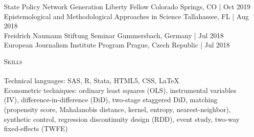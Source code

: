 \documentclass[a4paper,11pt]{article}
\newcommand{\lineunder} {
    \vspace*{-8pt} \\
    \hspace*{-18pt} \hrulefill \\
}
\newcommand{\header} [1] {
    {\hspace*{-18pt}\vspace*{6pt} \textsc{\large{#1}}}
    \vspace*{-6pt} \lineunder
}
\begin{document}
State Policy Network Generation Liberty Fellow \hfill Colorado Springs, CO | Oct 2019 \\

Epistemological and Methodological Approaches in Science \hfill Tallahassee, FL | Aug 2018\\

Freidrich Naumann Stiftung Seminar \hfill Gummersbach, Germany | Jul 2018\\

European Journalism Institute Program \hfill Prague, Czech Republic | Jul 2018 \\

\vspace{1mm}
\header{Skills}
Technical languages: SAS, R, Stata, HTML5, CSS, \LaTeX \\

Econometric techniques: ordinary least squares (OLS), instrumental variables (IV), difference-in-difference (DiD), two-stage staggered DiD, matching (propensity score, Mahalanobis distance, kernel, entropy, nearest-neighbor), synthetic control, regression discontinuity design (RDD), event study, two-way fixed-effects (TWFE)
\end{document}
